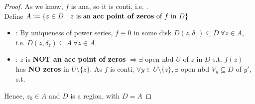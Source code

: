 \documentclass[12pt,a4paper]{article}
\begin{document}
\begin{proof}
  As we know, $f$ is ana, so it is conti, i.e. . \\

  \noindent Define $A := \{z \in D\ |\ z \text{ is an \textbf{acc point of zeros} of $f$ in $D$}\}$

  \begin{itemize}
    \item {}: By uniqueness of power series, $f \equiv 0$ in some disk $D(z, \delta_z) \subseteq D\ \forall z \in A$, i.e. $D(z, \delta_z) \subseteq A\ \forall z \in A$.
    \item {}: $z$ is \textbf{NOT an acc point of zeros} $\Rightarrow \exists$ open nbd $U$ of $z$ in $D$ s.t. $f(z)$ has \textbf{NO zeros} in $U \setminus \{z\}$. As $f$ is conti, $\forall y \in U \setminus \{z\}, \exists$ open nbd $V_y \subseteq D$ of $y'$, s.t. 
  \end{itemize}

  \noindent Hence, $z_0 \in A$ and $D$ is a region, with $D = A$
\end{proof}

\end{document}
